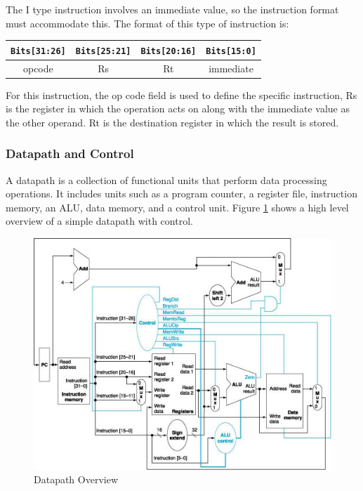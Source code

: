 \documentclass[12pt]{article}
\begin{document}
\noindent The I type instruction involves an immediate value, so the instruction format must accommodate this. The format of this type of instruction is: \\
\begin{center}

\begin{tabular}{|c|c|c|c|}
	\hline
	\texttt{Bits[31:26]} & \texttt{Bits[25:21]} & \texttt{Bits[20:16]} & \texttt{Bits[15:0]} \\ \hline
	opcode & Rs & Rt & immediate \\ \hline
\end{tabular}

\end{center}

\noindent For this instruction, the op code field is used to define the specific instruction, Rs is the register in which the operation acts on along with the immediate value as the other operand. Rt is the destination register in which the result is stored.

\subsubsection{Datapath and Control}
A datapath is a collection of functional units that perform data processing operations. It includes units such as a program counter, a register file, instruction memory, an ALU, data memory, and a control unit. Figure \ref{fig:textbook-datapth} shows a high level overview of a simple datapath with control.
\begin{figure}[H]
\centering
\includegraphics[width=\linewidth]{textbook-datapth}
\caption{Datapath Overview}
\label{fig:textbook-datapth}
\end{figure}
\end{document}

